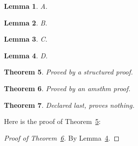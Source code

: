 \documentclass{article}
\newtheorem{theorem}{Theorem}
\newtheorem{lemma}[theorem]{Lemma}
\begin{document}
\begin{lemma}\label{lem:a}A.\end{lemma}
\begin{lemma}\label{lem:b}B.\end{lemma}
\begin{lemma}\label{lem:c}C.\end{lemma}
\begin{lemma}\label{lem:d}D.\end{lemma}
\begin{theorem}\label{thm:tree}Proved by a structured proof.\end{theorem}
\begin{theorem}\label{thm:plain}Proved by an amsthm proof.\end{theorem}
\begin{theorem}\label{thm:last}Declared last, proves nothing.\end{theorem}

Here is the proof of Theorem~\ref{thm:tree}:

\begin{structuredproof}
  \begin{structuredproof}
    \begin{structuredproof}
    \end{structuredproof}
  \end{structuredproof}
\end{structuredproof}

\begin{proof}[Proof of Theorem~\ref{thm:plain}]
  By Lemma~\ref{lem:d}.
\end{proof}
\end{document}
